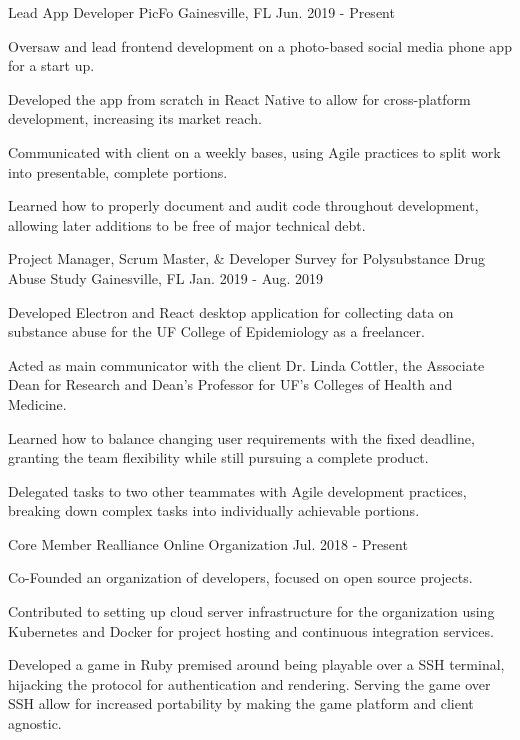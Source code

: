 \begin{cventries}
  \cventry
  {Lead App Developer}
  {PicFo}
  {Gainesville, FL}
  {Jun. 2019 - Present}
  {
    \begin{cvitems}
      \item {Oversaw and lead frontend development on a photo-based social media phone app for a start up.}
      \item {Developed the app from scratch in React Native to allow for cross-platform development, increasing its market reach.}
      \item {Communicated with client on a weekly bases, using Agile practices to split work into presentable, complete portions.}
      \item {Learned how to properly document and audit code throughout development, allowing later additions to be free of major technical debt.}
    \end{cvitems}
  }
  \cventry
    {Project Manager, Scrum Master, \& Developer}
    {Survey for Polysubstance Drug Abuse Study}
    {Gainesville, FL}
    {Jan. 2019 - Aug. 2019}
    {
      \begin{cvitems}
        \item {Developed Electron and React desktop application for collecting data on substance abuse for the UF College of Epidemiology as a freelancer.}
        \item {Acted as main communicator with the client Dr. Linda Cottler, the Associate Dean for Research and Dean's Professor for UF's Colleges of Health and Medicine.}
        \item {Learned how to balance changing user requirements with the fixed deadline, granting the team flexibility while still pursuing a complete product.}
        \item {Delegated tasks to two other teammates with Agile development practices, breaking down complex tasks into individually achievable portions.}
      \end{cvitems}
    }
  \cventry
    {Core Member}
    {Realliance}
    {Online Organization}
    {Jul. 2018 - Present}
    {
      \begin{cvitems}
        \item {Co-Founded an organization of developers, focused on open source projects.}
        \item {Contributed to setting up cloud server infrastructure for the organization using Kubernetes and Docker for project hosting and continuous integration services.}
        \item {Developed a game in Ruby premised around being playable over a SSH terminal, hijacking the protocol for authentication and rendering. Serving the game over SSH allow for increased portability by making the game platform and client agnostic.}
      \end{cvitems}
    }
\end{cventries}
